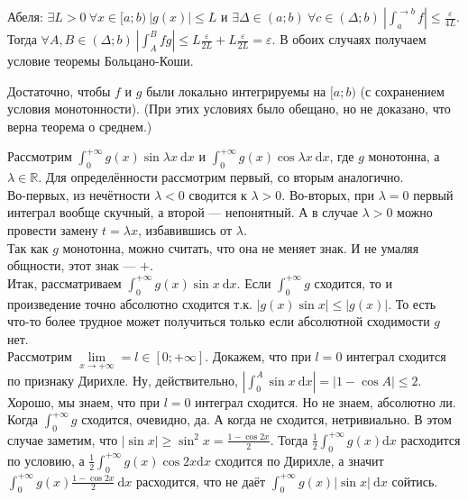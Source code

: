 \documentclass{article}
\begin{document}
\begin{itemize}
\begin{Proof}
            Абеля: $\exists L>0~\forall x\in[a;b)~|g(x)|\leqslant L$ и $\exists\Delta\in(a;b)~\forall c\in(\Delta;b)~\left|\int_a^{\to b}f\right|\leqslant\frac\varepsilon{4L}$. Тогда $\forall A,B\in(\Delta;b)~\left|\int_A^Bfg\right|\leqslant L\frac\varepsilon{2L}+L\frac\varepsilon{2L}=\varepsilon$. В обоих случаях получаем условие теоремы Больцано-Коши.
        \end{Proof}
        \begin{Comment}
            Достаточно, чтобы $f$ и $g$ были локально интегрируемы на $[a;b)$ (с сохранением условия монотонности). (При этих условиях было обещано, но не доказано, что верна теорема о среднем.)
        \end{Comment}
        \begin{Example}
            Рассмотрим $\int_0^{+\infty}g(x)\sin\lambda x~\mathrm dx$ и $\int_0^{+\infty}g(x)\cos\lambda x~\mathrm dx$, где $g$ монотонна, а $\lambda\in\mathbb R$. Для определённости рассмотрим первый, со вторым аналогично.\\
            Во-первых, из нечётности $\lambda<0$ сводится к $\lambda>0$. Во-вторых, при $\lambda=0$ первый интеграл вообще скучный, а второй --- непонятный. А в случае $\lambda>0$ можно провести замену $t=\lambda x$, избавившись от $\lambda$.\\
            Так как $g$ монотонна, можно считать, что она не меняет знак. И не умаляя общности, этот знак --- $+$.\\
            Итак, рассматриваем $\int_0^{+\infty}g(x)\sin x~\mathrm dx$. Если $\int_0^{+\infty}g$ сходится, то и произведение точно абсолютно сходится т.к. $|g(x)\sin x|\leqslant|g(x)|$. То есть что-то более трудное может получиться только если абсолютной сходимости $g$ нет.\\
            Рассмотрим $\lim\limits_{x\to+\infty}=l\in[0;+\infty]$. Докажем, что при $l=0$ интеграл сходится по признаку Дирихле. Ну, действительно, $\left|\int_0^A\sin x~\mathrm dx\right|=|1-\cos A|\leqslant 2$.\\
            Хорошо, мы знаем, что при $l=0$ интеграл сходится. Но не знаем, абсолютно ли. Когда $\int_0^{+\infty}g$ сходится, очевидно, да. А когда не сходится, нетривиально. В этом случае заметим, что $|\sin x|\geqslant\sin^2x=\frac{1-\cos 2x}2$. Тогда $\frac12\int_0^{+\infty}g(x)\mathrm dx$ расходится по условию, а $\frac12\int_0^{+\infty}g(x)\cos 2x\mathrm dx$ сходится по Дирихле, а значит $\int_0^{+\infty}g(x)\frac{1-\cos2x}2~\mathrm dx$ расходится, что не даёт $\int_0^{+\infty}g(x)|\sin x|~\mathrm dx$ сойтись.\\

\end{Example}
\end{itemize}
\end{document}
